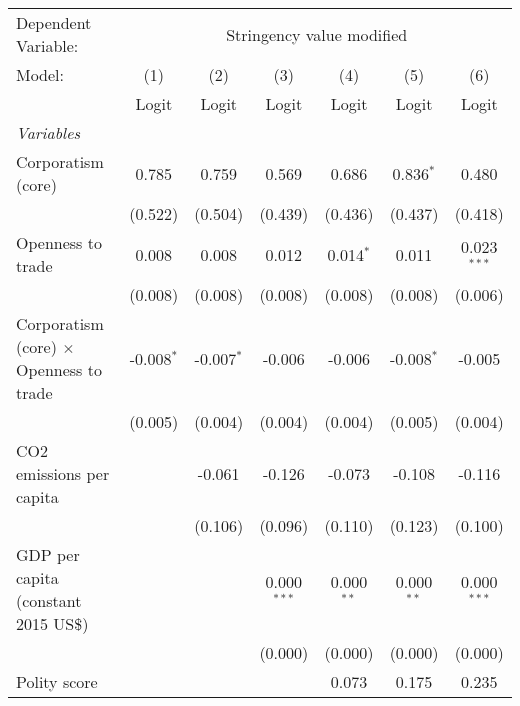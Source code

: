 
\begingroup
\centering
\begin{tabular}{lcccccc}
   \toprule
   Dependent Variable: & \multicolumn{6}{c}{Stringency value modified}\\
   Model:                                         & (1)          & (2)          & (3)           & (4)          & (5)          & (6)\\  
                                                  &  Logit       & Logit        & Logit         & Logit        & Logit        & Logit\\  
   \midrule
   \emph{Variables}\\
   Corporatism (core)                             & 0.785        & 0.759        & 0.569         & 0.686        & 0.836$^{*}$  & 0.480\\   
                                                  & (0.522)      & (0.504)      & (0.439)       & (0.436)      & (0.437)      & (0.418)\\   
   Openness to trade                              & 0.008        & 0.008        & 0.012         & 0.014$^{*}$  & 0.011        & 0.023$^{***}$\\   
                                                  & (0.008)      & (0.008)      & (0.008)       & (0.008)      & (0.008)      & (0.006)\\   
   Corporatism (core) $\times$ Openness to trade  & -0.008$^{*}$ & -0.007$^{*}$ & -0.006        & -0.006       & -0.008$^{*}$ & -0.005\\   
                                                  & (0.005)      & (0.004)      & (0.004)       & (0.004)      & (0.005)      & (0.004)\\   
   CO2 emissions per capita                       &              & -0.061       & -0.126        & -0.073       & -0.108       & -0.116\\   
                                                  &              & (0.106)      & (0.096)       & (0.110)      & (0.123)      & (0.100)\\   
   GDP per capita (constant 2015 US\$)            &              &              & 0.000$^{***}$ & 0.000$^{**}$ & 0.000$^{**}$ & 0.000$^{***}$\\   
                                                  &              &              & (0.000)       & (0.000)      & (0.000)      & (0.000)\\   
   Polity score                                   &              &              &               & 0.073        & 0.175        & 0.235\\   

\end{tabular}
